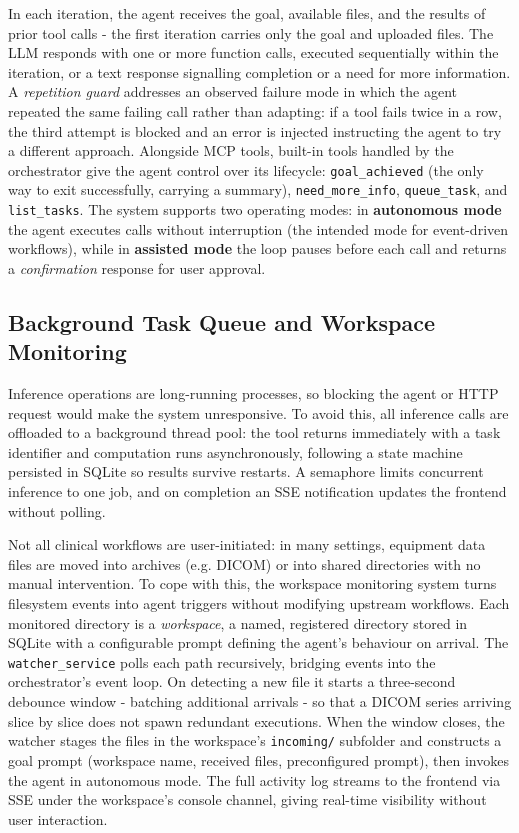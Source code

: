 \documentclass[1p,12pt]{elsarticle}
\begin{document}
In each iteration, the agent receives the goal, available files, and the results of prior tool calls - the first iteration carries only the goal and uploaded files. The LLM responds with one or more function calls, executed sequentially within the iteration, or a text response signalling completion or a need for more information. A \emph{repetition guard} addresses an observed failure mode in which the agent repeated the same failing call rather than adapting: if a tool fails twice in a row, the third attempt is blocked and an error is injected instructing the agent to try a different approach. Alongside MCP tools, built-in tools handled by the orchestrator give the agent control over its lifecycle: \texttt{goal\_achieved} (the only way to exit successfully, carrying a summary), \texttt{need\_more\_info}, \texttt{queue\_task}, and \texttt{list\_tasks}. The system supports two operating modes: in \textbf{autonomous mode} the agent executes calls without interruption (the intended mode for event-driven workflows), while in \textbf{assisted mode} the loop pauses before each call and returns a \emph{confirmation} response for user approval.

\subsection{Background Task Queue and Workspace Monitoring}
Inference operations are long-running processes, so blocking the agent or HTTP request would make the system unresponsive. To avoid this, all inference calls are offloaded to a background thread pool: the tool returns immediately with a task identifier and computation runs asynchronously, following a state machine persisted in SQLite so results survive restarts. A semaphore limits concurrent inference to one job, and on completion an SSE notification updates the frontend without polling.

Not all clinical workflows are user-initiated: in many settings, equipment data files are moved into archives (e.g. DICOM) or into shared directories  with no manual intervention. To cope with this, the workspace monitoring system turns filesystem events into agent triggers without modifying upstream workflows. Each monitored directory is a \textit{workspace}, a named, registered directory stored in SQLite with a configurable prompt defining the agent's behaviour on arrival. The \texttt{watcher\_service} polls each path recursively, bridging events into the orchestrator's event loop. On detecting a new file it starts a three-second debounce window - batching additional arrivals - so that a DICOM series arriving slice by slice does not spawn redundant executions. When the window closes, the watcher stages the files in the workspace's \texttt{incoming/} subfolder and constructs a goal prompt (workspace name, received files, preconfigured prompt), then invokes the agent in autonomous mode. The full activity log streams to the frontend via SSE under the workspace's console channel, giving real-time visibility without user interaction.
\end{document}
